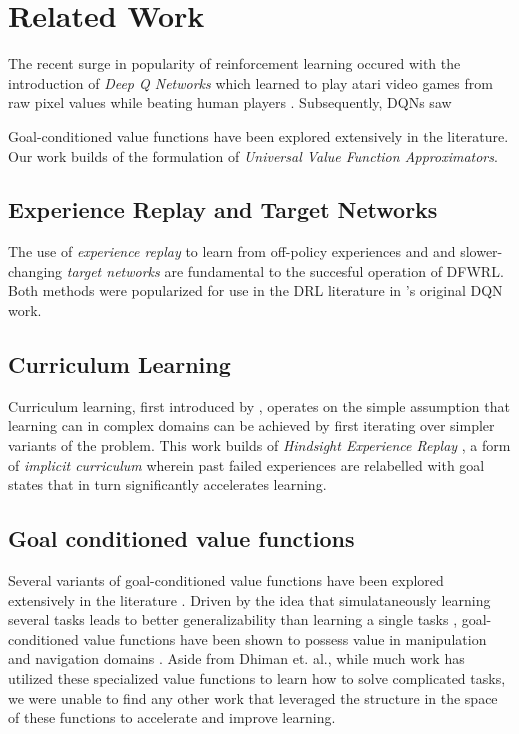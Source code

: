 \section{Related Work}


The recent surge in popularity of reinforcement learning occured with
the introduction of \emph{Deep Q Networks} which
learned to play atari video games from raw pixel values while beating
human players \citep{mnih2013playing}. Subsequently,
DQNs saw

Goal-conditioned value functions have been explored extensively in the
literature. Our work builds of the formulation of \emph{Universal Value Function
Approximators}\cite{schaul2015universal}.  


\subsection{Experience Replay and Target Networks}
The use of \emph{experience replay} to learn from off-policy experiences
and and slower-changing \emph{target
networks} are fundamental to the succesful operation of DFWRL. Both
methods were popularized for use in the DRL literature in
\citet{mnih2015human}'s original DQN work. 

\subsection{Curriculum Learning}
Curriculum learning, first introduced by \citet{bengio2009curriculum},
operates on the simple assumption that learning can in complex domains
can be achieved by first iterating over simpler variants of the problem.
This work builds of \emph{Hindsight Experience Replay}
\citep{andrychowicz2017hindsight}, a form of \emph{implicit curriculum}
wherein past failed experiences are relabelled with goal states that in
turn significantly accelerates learning. 


\subsection{Goal conditioned value functions}
Several variants of goal-conditioned value functions have been explored
extensively in the literature
\citep{sutton2011horde,schaul2015universal}.  Driven by the idea that
simulataneously learning several tasks leads to better generalizability
than learning a single tasks \citep{pong2018temporal}, goal-conditioned
value functions have been shown to possess value in manipulation
\citep{plappert2018multi,peng2018sim} and navigation domains
\citep{zhang2017deep,mirowski2018learning}. Aside from Dhiman et. al.,
while much work has utilized these specialized value functions to learn
how to solve complicated tasks, we were unable to find any other work
that leveraged the structure in the space of these functions to
accelerate and improve learning. 


